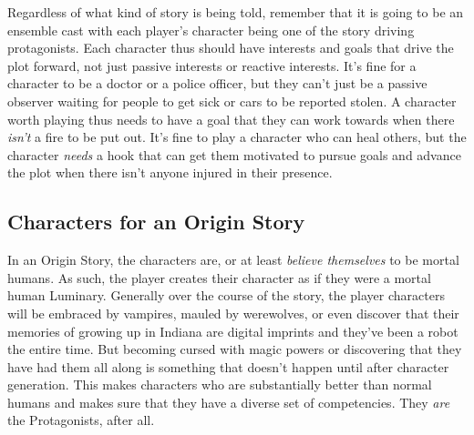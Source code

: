 Regardless of what kind of story is being told, remember that it is going to be an ensemble cast with each player's character being one of the story driving protagonists. Each character thus should have interests and goals that drive the plot forward, not just passive interests or reactive interests. It's fine for a character to be a doctor or a police officer, but they can't just be a passive observer waiting for people to get sick or cars to be reported stolen. A character worth playing thus needs to have a goal that they can work towards when there \textit{isn't} a fire to be put out. It's fine to play a character who can heal others, but the character \textit{needs} a hook that can get them motivated to pursue goals and advance the plot when there isn't anyone injured in their presence.

\subsection[Origin Story]{Characters for an Origin Story}

In an Origin Story, the characters are, or at least \textit{believe themselves} to be mortal humans. As such, the player creates their character as if they were a mortal human Luminary. Generally over the course of the story, the player characters will be embraced by vampires, mauled by werewolves, or even discover that their memories of growing up in Indiana are digital imprints and they've been a robot the entire time. But becoming cursed with magic powers or discovering that they have had them all along is something that doesn't happen until after character generation. This makes characters who are substantially better than normal humans and makes sure that they have a diverse set of competencies. They \textit{are} the Protagonists, after all.

